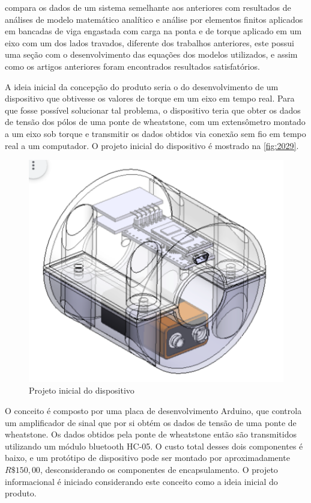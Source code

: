 \autocite{Silva2017} compara os dados de um sistema semelhante aos anteriores com resultados de análises de modelo matemático analítico e análise por elementos finitos aplicados em bancadas de viga engastada com carga
na ponta e de torque aplicado em um eixo com um dos lados travados, diferente dos trabalhos anteriores, este possui uma seção com o desenvolvimento das equações dos modelos utilizados, e assim como os artigos anteriores
foram encontrados resultados satisfatórios.

A ideia inicial da concepção do produto seria o do desenvolvimento de um dispositivo que obtivesse os valores de torque em um eixo em tempo real. Para que fosse possível solucionar tal problema, o dispositivo teria que
obter os dados de tensão dos pólos de uma ponte de wheatstone, com um extensômetro montado a um eixo sob torque e transmitir os dados obtidos via conexão sem fio em tempo real a um computador. O projeto inicial do
dispositivo é mostrado na \autoref{fig:2029}.

\begin{figure}[htb]
	\caption{\label{fig:2029} Projeto inicial do dispositivo}
	\begin{center}
		\includegraphics[width=\textwidth]{pictures/2029.png}
	\end{center}
\end{figure}

O conceito é composto por uma placa de desenvolvimento Arduino, que controla um amplificador de sinal que por si obtém os dados de tensão de uma ponte de wheatstone. Os dados obtidos pela ponte de wheatstone então
são transmitidos utilizando um módulo bluetooth HC-05. O custo total desses dois componentes é baixo, e um protótipo de dispositivo pode ser montado por aproximadamente $R\$150,00$, desconsiderando os componentes de
encapsulamento. O projeto informacional é iniciado considerando este conceito como a ideia inicial do produto.

